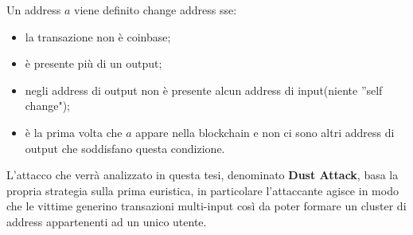 Un address $a$ viene definito change address sse:
\begin{itemize}
    \item la transazione non è coinbase;
    \item è presente più di un output;
    \item negli address di output non è presente alcun address di input(niente ''self change");
    \item è la prima volta che $a$ appare nella blockchain e non ci sono altri address di output che soddisfano questa condizione.
\end{itemize}

L'attacco che verrà analizzato in questa tesi, denominato \textbf{Dust Attack}, basa la propria strategia sulla prima euristica, in particolare l'attaccante agisce in modo che le vittime generino transazioni multi-input così da poter formare un cluster di address appartenenti ad un unico utente.






